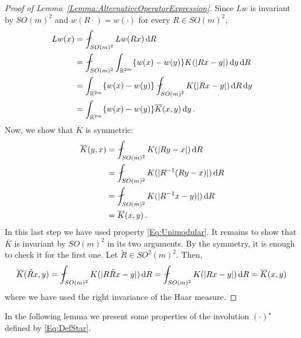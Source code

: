 \begin{proof}[Proof of Lemma~\ref{Lemma:AlternativeOperatorExpression}]
	Since $Lw$ is invariant by $SO(m)^2$ and $w(R \cdot) = w(\cdot)$ for every $R\in SO(m)^2$,
	\begin{align*}
		Lw(x) &= \average_{SO(m)^2} Lw(Rx)\d R\\
		 &=  \average_{SO(m)^2} \int_{\R^{2m}} \{w(x) - w(y)\}K(|Rx - y|) \d y \d R\\
		 &= \int_{\R^{2m}} \{w(x) - w(y)\}  \average_{SO(m)^2} K(|Rx - y|) \d R  \d y\\
		 &= \int_{\R^{2m}} \{w(x) - w(y)\}  \overline{K}(x,y) \d y\,.
	\end{align*}
	Now, we show that $\overline{K}$ is symmetric:
	\begin{align*}
	\overline{K}(y,x) &= \average_{SO(m)^2} K(|R y - x|)\d R \\
	&= \average_{SO(m)^2} K(|R^{-1} (R y - x)|)\d R \\
	&= \average_{SO(m)^2} K(|R^{-1}x-y)|)\d R \\ 
	&= \overline{K}(x,y)\,.  
	\end{align*}
	In this last step we have used property \eqref{Eq:Unimodular}. It remains to show that $\overline{K}$ is invariant by $SO(m)^2$ in its two arguments. By the symmetry, it is enough to check it for the first one. Let $\tilde{R} \in SO^2(m)^2$. Then,
	$$
	\overline{K} (\tilde{R}x, y) = \average_{SO(m)^2} K(|R \tilde{R} x - y|)\d R  = \average_{SO(m)^2} K(|R x - y|)\d R = \overline{K} (x, y)\,
	$$
	where we have used the right invariance of the Haar measure. 
\end{proof}

In the following lemma we present some properties of the involution $(\cdot)^\star$ defined by \eqref{Eq:DefStar}.

